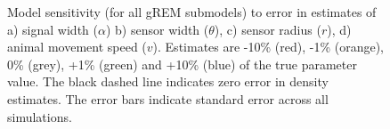 \documentclass[a4paper,10pt,reqno,oneside]{amsart}
\begin{document}
\begin{figure}[t]
\begin{subfigure}[t]{7cm}
                \caption{}               
                \label{f:speed}
        \end{subfigure}%
\caption{Model sensitivity (for all gREM submodels) to error in estimates of a) signal width ($\alpha$)  b) sensor width ($\theta$), c) sensor radius ($r$), d) animal movement speed ($v$). Estimates are -10\% (red), -1\% (orange), 0\% (grey), +1\% (green) and +10\% (blue) of the true parameter value. The black dashed line indicates zero error in density estimates. The error bars indicate standard error across all simulations.
}

\label{f:sensitivity}
\end{figure}
\end{document}
